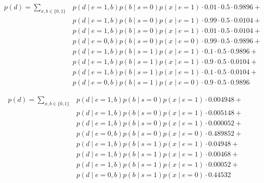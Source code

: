 \documentclass[12pt]{report}
\begin{document}
\begin{align*}    
    p(d) = \sum_{x,b \in \{0,1\}}  
        &p(d\mid e=1,b)p(b\mid s=0)p(x\mid e=1) \cdot 0.01 \cdot 0.5 \cdot 0.9896 + \\
        &p(d\mid e=1,b)p(b\mid s=0)p(x\mid e=1) \cdot 0.99 \cdot 0.5 \cdot 0.0104 + \\ 
        &p(d\mid e=1,b)p(b\mid s=0)p(x\mid e=1) \cdot 0.01 \cdot 0.5 \cdot 0.0104 + \\
        &p(d\mid e=0,b)p(b\mid s=0)p(x\mid e=0) \cdot 0.99 \cdot 0.5 \cdot 0.9896 + \\        
        &p(d\mid e=1,b)p(b\mid s=1)p(x\mid e=1) \cdot 0.1  \cdot 0.5 \cdot 0.9896 + \\
        &p(d\mid e=1,b)p(b\mid s=1)p(x\mid e=1) \cdot 0.9  \cdot 0.5 \cdot 0.0104 + \\ 
        &p(d\mid e=1,b)p(b\mid s=1)p(x\mid e=1) \cdot 0.1  \cdot 0.5 \cdot 0.0104 + \\
        &p(d\mid e=0,b)p(b\mid s=1)p(x\mid e=0) \cdot 0.9  \cdot 0.5 \cdot 0.9896
\end{align*}


\begin{align*}    
    p(d) = \sum_{x,b \in \{0,1\}}  
        &p(d\mid e=1,b)p(b\mid s=0)p(x\mid e=1) \cdot 0.004948 + \\
        &p(d\mid e=1,b)p(b\mid s=0)p(x\mid e=1) \cdot 0.005148 + \\ 
        &p(d\mid e=1,b)p(b\mid s=0)p(x\mid e=1) \cdot 0.000052 + \\
        &p(d\mid e=0,b)p(b\mid s=0)p(x\mid e=0) \cdot 0.489852 + \\        
        &p(d\mid e=1,b)p(b\mid s=1)p(x\mid e=1) \cdot 0.04948 + \\
        &p(d\mid e=1,b)p(b\mid s=1)p(x\mid e=1) \cdot 0.00468 + \\ 
        &p(d\mid e=1,b)p(b\mid s=1)p(x\mid e=1) \cdot 0.00052 + \\
        &p(d\mid e=0,b)p(b\mid s=1)p(x\mid e=0) \cdot 0.44532
\end{align*}
\end{document}
